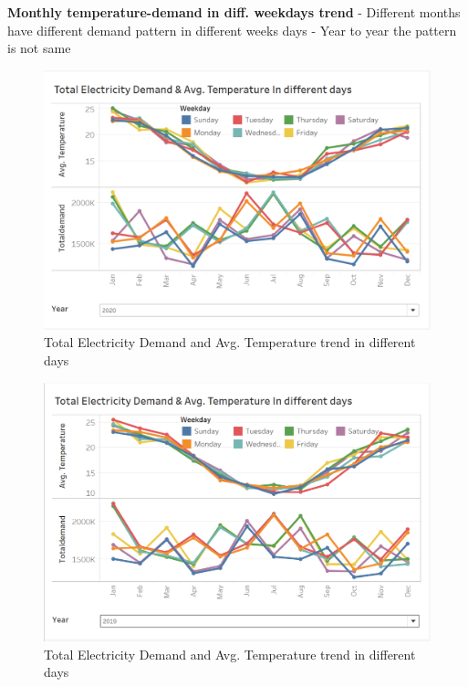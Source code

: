 \documentclass[mstat,12pt]{unswthesis}
\begin{document}
\textbf{Monthly temperature-demand in diff. weekdays trend} \newline
\newline - Different months have different demand pattern in different
weeks days \newline - Year to year the pattern is not same \newline

\begin{figure}[H]
\includegraphics{snapshots1/Slide 3 snapshot 1.png}
\caption{Total Electricity Demand and Avg. Temperature trend in different days}\label{4.2}
\end{figure}

\begin{figure}[H]
\includegraphics{snapshots1/Slide 3 snapshot 2.png}
\caption{Total Electricity Demand and Avg. Temperature trend in different days}\label{4.3}
\end{figure}
\end{document}
